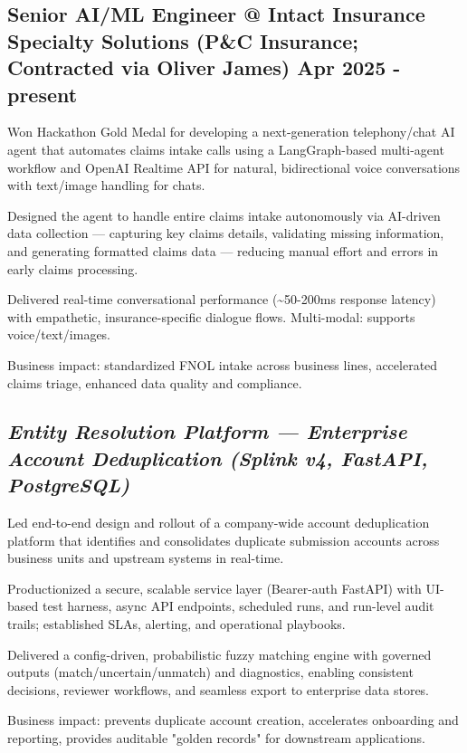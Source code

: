 \documentclass[letter,10pt]{article}
\begin{document}
\subsection{Senior AI/ML Engineer @ Intact Insurance Specialty Solutions (P\&C Insurance; Contracted via Oliver James) \hfill Apr 2025 - present}
\vspace{0.5em}
\begin{zitemize}
\item Won Hackathon Gold Medal for developing a next-generation telephony/chat AI agent that automates claims intake calls using a LangGraph-based multi-agent workflow and OpenAI Realtime API for natural, bidirectional voice conversations with text/image handling for chats.
\item Designed the agent to handle entire claims intake autonomously via AI-driven data collection — capturing key claims details, validating missing information, and generating formatted claims data — reducing manual effort and errors in early claims processing.
\item Delivered real-time conversational performance (\textasciitilde{}50-200ms response latency) with empathetic, insurance-specific dialogue flows. Multi-modal: supports voice/text/images.
\item Business impact: standardized FNOL intake across business lines, accelerated claims triage, enhanced data quality and compliance.
\end{zitemize}

\subsection{\textbf{\textit{Entity Resolution Platform — Enterprise Account Deduplication   (Splink v4, FastAPI, PostgreSQL)}}}
\vspace{0.1em}
\begin{zitemize}
\item Led end-to-end design and rollout of a company-wide account deduplication platform that identifies and consolidates duplicate submission accounts across business units and upstream systems in real-time.
\item Productionized a secure, scalable service layer (Bearer-auth FastAPI) with UI-based test harness, async API endpoints, scheduled runs, and run-level audit trails; established SLAs, alerting, and operational playbooks.
\item Delivered a config-driven, probabilistic fuzzy matching engine with governed outputs (match/uncertain/unmatch) and diagnostics, enabling consistent decisions, reviewer workflows, and seamless export to enterprise data stores.
\item Business impact: prevents duplicate account creation, accelerates onboarding and reporting, provides auditable "golden records" for downstream applications.
\end{zitemize}
\end{document}
